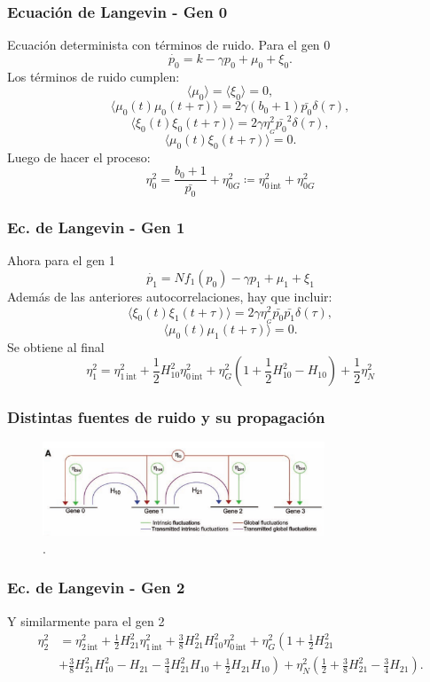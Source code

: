 \documentclass{beamer}
\begin{document}
\begin{frame}
  \frametitle{Ecuaci\'on de Langevin - Gen 0}
Ecuaci\'on determinista con t\'erminos de ruido. Para el gen 0
$$\dot{p_0} = k - \gamma p_0 + \mu_0 + \xi_{0}.$$
Los t\'erminos de ruido cumplen:
$$\langle \mu_0 \rangle = \langle \xi_0 \rangle = 0,$$
$$\langle \mu_0(t)\mu_0(t+\tau) \rangle  = 2\gamma (b_0+1) \bar{p_0} \delta(\tau),$$
$$\langle \xi_0(t)\xi_0(t+\tau) \rangle = 2 \gamma \eta_{_G}^2\bar{p_0}^2 \delta(\tau),$$
$$\langle \mu_0(t)\xi_0(t+\tau) \rangle = 0.$$
Luego de hacer el proceso:
$$\eta_0^2=\frac{b_0+1}{\bar{p_0}} + \eta_{0G}^2\coloneqq\eta_{0\,\text{int}}^2+\eta_{0G}^2$$
\end{frame}

\begin{frame}
\frametitle{Ec. de Langevin - Gen 1}
Ahora para el gen 1
$$\dot{p_1} = Nf_1(p_{0}) - \gamma p_1 + \mu_1 + \xi_1$$
Adem\'as de las anteriores autocorrelaciones, hay que incluir:
$$\langle \xi_0(t)\xi_1(t+\tau) \rangle = 2 \gamma \eta_{_G}^2\bar{p_0}\bar{p_1}\delta(\tau),$$
$$\langle \mu_0(t)\mu_1(t+\tau) \rangle =0.$$
Se obtiene al final
$$\eta_1^2 = \eta_{1\,\text{int}}^2 + \frac{1}{2} H_{10}^2 \eta_{0\,\text{int}}^2 + \eta_G^2\left( 1 + \frac{1}{2} H_{10}^2 - H_{10} \right) + \frac{1}{2} \eta_N^2 $$
\end{frame}

\begin{frame}
\frametitle{Distintas fuentes de ruido y su propagaci\'on}
\begin{figure}[p]
    \centering
    \includegraphics[width=0.75\textwidth]{globalint.png}\\
    \tiny \cite{pedraza05}.
\end{figure}
\end{frame}

\begin{frame}
\frametitle{Ec. de Langevin - Gen 2}
Y similarmente para el gen 2
\begin{align*}
\eta_2^2 &= \eta_{2\,\text{int}}^2 + \frac{1}{2} H_{21}^2 \eta_{1\,\text{int}}^2 + \frac{3}{8}H_{21}^2H_{10}^2\eta_{0\,\text{int}}^2 + \eta_G^2 \left(1 + \frac{1}{2} H_{21}^2\right.\\
&\left.+ \frac{3}{8} H_{21}^2H_{10}^2 - H_{21} - \frac{3}{4}H_{21}^2H_{10} + \frac{1}{2} H_{21}H_{10} \right) + \eta_N^2 \left( \frac{1}{2} + \frac{3}{8}H_{21}^2-\frac{3}{4}H_{21}\right).
\end{align*}
\end{frame}
\end{document}
